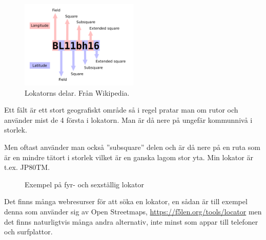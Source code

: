 \begin{figure}[h]
	\centering
	\includegraphics[width=0.5\textwidth]{pic/lokator.png}
	\caption{Lokatorns delar. Från Wikipedia.}
\end{figure}

Ett fält är ett stort geografiskt område så i regel pratar man om rutor och
använder mist de 4 första i lokatorn. Man är då nere på ungefär kommunnivå i
storlek.

Men oftast använder man också ''subsquare'' delen och är då nere på en ruta
som är en mindre tätort i storlek vilket är en ganska lagom stor yta. Min
lokator är t.ex. JP80TM.

\begin{figure}[H]
	\centering
	\qquad
	\caption{Exempel på fyr- och sexställig lokator}
\end{figure}

Det finns många webresurser för att söka en lokator, en sådan är till exempel
denna som använder sig av Open Streetmaps,
\url{https://f5len.org/tools/locator} men det finns naturligtvis många andra
alternativ, inte minst som appar till telefoner och surfplattor.

